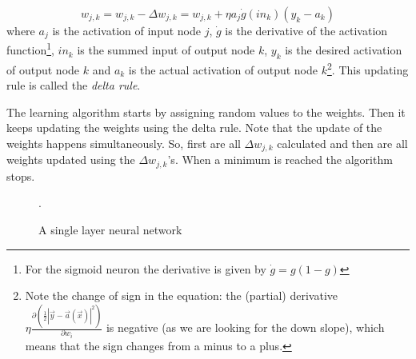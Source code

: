 \begin{equation}
w_{j,k} = w_{j,k} - \Delta w_{j,k} = w_{j,k} + \eta a_{j} \dot{g}(in_k)(y_k - a_k)
\end{equation}
where $a_j$ is the activation of input node $j$, $\dot{g}$ is the derivative of the activation function\footnote{For the sigmoid neuron the derivative is given by $\dot{g} = g(1-g)$}, $in_k$ is the summed input of output node $k$, $y_k$ is the desired activation of output node $k$ and $a_k$ is the actual activation of output node $k$\footnote{Note the change of sign in the equation: the (partial) derivative $\eta \frac{\partial(\frac{1}{2} \left | \vec{y} - \vec{a}(\vec{x}) \right |^2)}{\partial w_i}$ is negative (as we are looking for the down slope), which means that the sign changes from a minus to a plus.}. This updating rule is called the \textit{delta rule}.

The learning algorithm starts by assigning random values to the weights. Then it keeps updating the weights using the delta rule. Note that the update of the weights happens simultaneously. So, first are all $\Delta w_{j,k}$ calculated and then are all weights updated using the $\Delta w_{j,k}$'s. When a minimum is reached the algorithm stops.

\begin{figure}
\centering
{}
\caption{A single layer neural network}.
\label{fig:single_layer_neural_network}
\end{figure}

